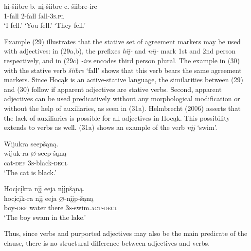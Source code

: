 \documentclass[output=paper]{LSP/langsci}
\begin{document}
\begin{exe}
\ex
\begin{xlist}
\ex \gll
hį-šiibre \hspace{30pt}  b. {} nį-šiibre \hspace{43pt} c. {} šiibre-ire\\
1-fall {} {} {} 2-fall {} {} {} fall-\textsc{3s.pl}\\
\glt `I fell.' \hspace{2cm} `You fell.'  \hspace{1.7cm} `They fell.'


\end{xlist}
\end{exe}

Example (29) illustrates that the stative set of agreement markers may be used with adjectives: in (29a,b), the prefixes \textit{hiį-} and \textit{niį-} mark 1st and 2nd person respectively, and in (29c) \textit{-ire} encodes third person plural. The example in (30) with the stative verb \textit{šiibre} `fall' shows that this verb bears the same agreement markers. Since Hocąk is an active-stative language, the similarities between (29) and (30) follow if apparent adjectives are stative verbs. Second, apparent adjectives can be used predicatively without any morphological modification or without the help of auxiliaries, as seen in (31a). Helmbrecht (2006) asserts that the lack of auxiliaries is possible for all adjectives in Hocąk. This possibility extends to verbs as well. (31a) shows an example of the verb \textit{nįį} `swim'.

\begin{exe}
\ex
\begin{xlist}

\ex \glll Wijukra seepšąną. \\
wijuk-ra {$\varnothing$}-seep-šąną\\
cat-\textsc{def} \textsc{3s}-black-\textsc{decl}\\
\glt `The cat is black.'


\ex \glll Hocįcįkra nįį eeja nįįpšąną.\\
hocįcįk-ra nįį eeja {$\varnothing$}-nįįp-šąną\\
boy-\textsc{def} water there \textsc{3s}-swim.\textsc{act}-\textsc{decl}\\
\glt `The boy swam in the lake.'

\end{xlist}
\end{exe}


Thus, since verbs and purported adjectives may also be the main predicate of the clause, there is no structural difference between adjectives and verbs.
\end{document}
